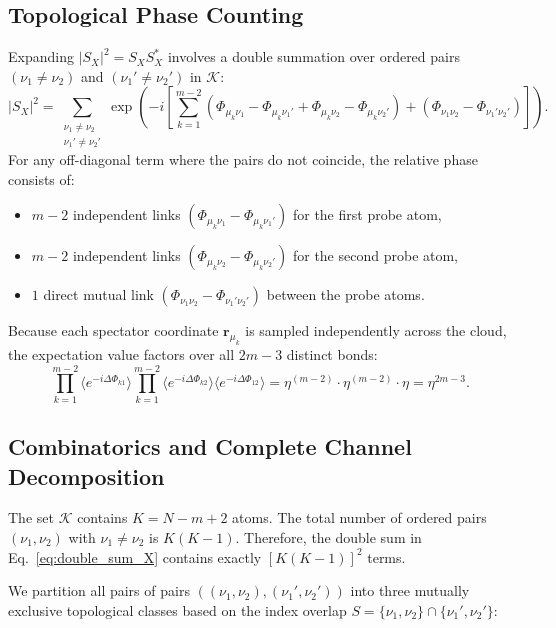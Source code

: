 \documentclass[11pt,a4paper]{article}
\begin{document}
\subsection{Topological Phase Counting}
Expanding $|S_X|^2 = S_X S_X^*$ involves a double summation over ordered pairs $(\nu_1 \ne \nu_2)$ and $(\nu_1' \ne \nu_2')$ in $\mathcal{K}$:
\begin{equation}
    |S_X|^2 = \sum_{\substack{\nu_1 \ne \nu_2 \\ \nu_1' \ne \nu_2'}} \exp\left( -i \left[ \sum_{k=1}^{m-2} (\Phi_{\mu_k \nu_1} - \Phi_{\mu_k \nu_1'} + \Phi_{\mu_k \nu_2} - \Phi_{\mu_k \nu_2'}) + (\Phi_{\nu_1 \nu_2} - \Phi_{\nu_1' \nu_2'}) \right] \right).
    \label{eq:double_sum_X}
\end{equation}
For any off-diagonal term where the pairs do not coincide, the relative phase consists of:
\begin{itemize}
    \item $m - 2$ independent links $(\Phi_{\mu_k \nu_1} - \Phi_{\mu_k \nu_1'})$ for the first probe atom,
    \item $m - 2$ independent links $(\Phi_{\mu_k \nu_2} - \Phi_{\mu_k \nu_2'})$ for the second probe atom,
    \item $1$ direct mutual link $(\Phi_{\nu_1 \nu_2} - \Phi_{\nu_1' \nu_2'})$ between the probe atoms.
\end{itemize}
Because each spectator coordinate $\mathbf{r}_{\mu_k}$ is sampled independently across the cloud, the expectation value factors over all $2m - 3$ distinct bonds:
\begin{equation}
    \prod_{k=1}^{m-2} \langle e^{-i \Delta \Phi_{k1}} \rangle \prod_{k=1}^{m-2} \langle e^{-i \Delta \Phi_{k2}} \rangle \langle e^{-i \Delta \Phi_{12}} \rangle = \eta^{(m-2)} \cdot \eta^{(m-2)} \cdot \eta = \eta^{2m - 3}.
    \label{eq:eta_power_2m_minus_3}
\end{equation}

\subsection{Combinatorics and Complete Channel Decomposition}
The set $\mathcal{K}$ contains $K = N - m + 2$ atoms. The total number of ordered pairs $(\nu_1, \nu_2)$ with $\nu_1 \ne \nu_2$ is $K(K - 1)$. Therefore, the double sum in Eq.~\eqref{eq:double_sum_X} contains exactly $[K(K - 1)]^2$ terms.

We partition all pairs of pairs $((\nu_1, \nu_2), (\nu_1', \nu_2'))$ into three mutually exclusive topological classes based on the index overlap $S = \{\nu_1, \nu_2\} \cap \{\nu_1', \nu_2'\}$:
\end{document}

